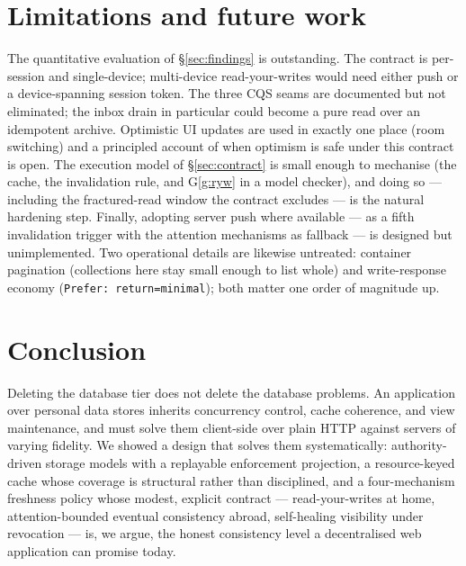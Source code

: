 \documentclass[11pt,a4paper]{article}
\theoremstyle{remark}
\newcommand{\code}[1]{\texttt{#1}}
\begin{document}
\section{Limitations and future work}\label{sec:limits}

The quantitative evaluation of \S\ref{sec:findings} is outstanding. The
contract is per-session and single-device; multi-device read-your-writes would
need either push or a device-spanning session token. The three CQS seams are
documented but not eliminated; the inbox drain in particular could become a pure
read over an idempotent archive. Optimistic UI updates are used in exactly one
place (room switching) and a principled account of when optimism is safe under
this contract is open. The execution model of \S\ref{sec:contract} is small
enough to mechanise (the cache, the invalidation rule, and G\ref{g:ryw} in a
model checker), and doing so --- including the fractured-read window the
contract excludes --- is the natural hardening step. Finally, adopting server push where available --- as a
fifth invalidation trigger with the attention mechanisms as fallback --- is
designed but unimplemented. Two operational details are likewise untreated:
container pagination (collections here stay small enough to list whole) and
write-response economy (\code{Prefer: return=minimal}); both matter one order
of magnitude up.

\section{Conclusion}

Deleting the database tier does not delete the database problems. An application
over personal data stores inherits concurrency control, cache coherence, and
view maintenance, and must solve them client-side over plain HTTP against
servers of varying fidelity. We showed a design that solves them systematically:
authority-driven storage models with a replayable enforcement projection,
a resource-keyed cache whose coverage is structural rather than disciplined,
and a four-mechanism freshness policy whose modest, explicit contract ---
read-your-writes at home, attention-bounded eventual consistency abroad,
self-healing visibility under revocation --- is, we argue, the honest
consistency level a decentralised web application can promise today.



\end{document}
